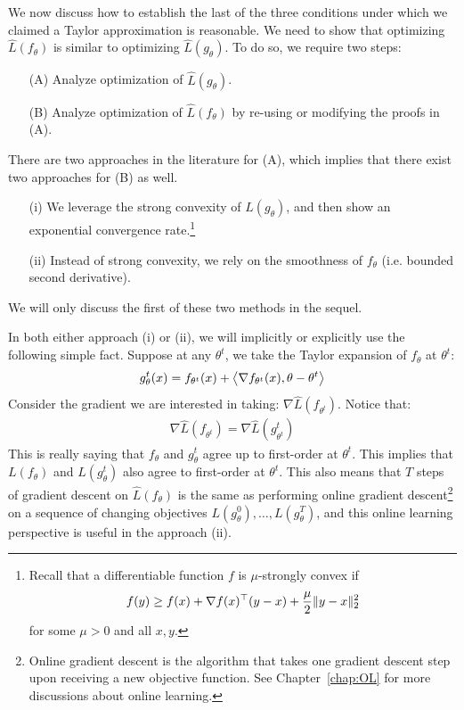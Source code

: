 We now discuss how to establish the last of the three conditions under which we claimed a Taylor approximation is reasonable. We need to show that  optimizing $\hat{L} (f_\theta)$ is similar to optimizing $\hat{L}(g_\theta)$. To do so, we require two steps:
\begin{enumerate}[label=\alph*]
    \item[(A)] Analyze optimization of $\hat{L}(g_\theta)$.
    \item[(B)] Analyze optimization of $\hat{L}(f_\theta)$ by re-using or modifying the proofs in (A).
\end{enumerate}
There are two approaches in the literature for (A), which implies that there exist two approaches for (B) as well. 
\begin{enumerate}
    \item[(i)] We leverage the strong convexity of $\hat{L} (g_\theta)$, and then show an exponential convergence rate.\footnote{Recall that a differentiable function $f$ is $\mu$-strongly convex if 
    \begin{align} 
        f(y) \geq f(x) + \nabla f(x)^\top (y-x) + \frac{\mu}{2} \|y-x\|_2^2
    \end{align} for some $\mu>0$ and all $x,y$.} 
    \item[(ii)] Instead of strong convexity, we rely on the smoothness of $f_\theta$ (i.e. bounded second derivative). 
\end{enumerate}
We will only discuss the first of these two methods in the sequel.

\begin{remark} In both either approach (i) or (ii), we will implicitly or explicitly use the following simple fact. 
Suppose at any $\theta^t$, we take the Taylor expansion of $f_\theta$ at $\theta^t$:
\begin{align} 
    g_\theta^t(x) = f_{\theta^t} (x) + \left\langle \nabla f_{\theta^t} (x),\theta-\theta^t \right\rangle 
\end{align} 
Consider the gradient we are interested in taking: $\nabla \hat{L} ( f_{\theta^t})$. Notice that: \begin{align} 
    \nabla \hat{L} ( f_{\theta^t}) = \nabla \hat{L} ( g_{\theta^t}^t)
\end{align} 
This is really saying that $f_\theta$ and $g_\theta^t$ agree up to first-order at $\theta^t$. This implies that $L(f_\theta)$ and $L(g_\theta^t)$ also agree to first-order at $\theta^t$. This also means that $T$ steps of gradient descent on $\hat{L}(f_\theta)$ is the same as performing online gradient descent\footnote{Online gradient descent is the algorithm that takes one gradient descent step upon receiving a new objective function. See Chapter~\ref{chap:OL} for more discussions about online learning.} on a sequence of changing objectives $L(g_\theta^0), \ldots, L(g_\theta^T)$, and this online learning perspective is useful in the approach (ii). 
\end{remark} 

